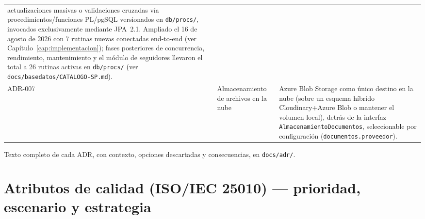 \begin{table}[H]
\begin{tabular}{@{}p{1.4cm}p{3.4cm}p{9.4cm}@{}}
  actualizaciones masivas o validaciones cruzadas vía
  procedimientos/funciones PL/pgSQL versionados en \texttt{db/procs/},
  invocados exclusivamente mediante JPA~2.1. Ampliado el 16 de agosto de
  2026 con 7 rutinas nuevas conectadas end-to-end (ver
  Capítulo~\ref{cap:implementacion}); fases posteriores de concurrencia,
  rendimiento, mantenimiento y el módulo de seguidores llevaron el total a
  26 rutinas activas en \texttt{db/procs/} (ver
  \texttt{docs/basedatos/CATALOGO-SP.md}). \\
ADR-007 & Almacenamiento de archivos en la nube & Azure Blob Storage como
  único destino en la nube (sobre un esquema híbrido Cloudinary+Azure Blob
  o mantener el volumen local), detrás de la interfaz
  \texttt{AlmacenamientoDocumentos}, seleccionable por configuración
  (\texttt{documentos.proveedor}). \\
\bottomrule
\end{tabular}
\end{table}

Texto completo de cada ADR, con contexto, opciones descartadas y
consecuencias, en \texttt{docs/adr/}.

\section{Atributos de calidad (ISO/IEC 25010) --- prioridad, escenario y estrategia}

